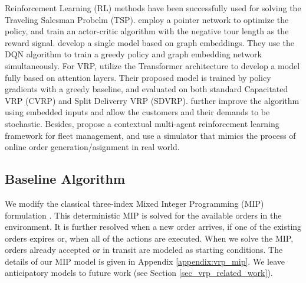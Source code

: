 Reinforcement Learning (RL) methods have been successfully used for solving the Traveling Salesman Probelm (TSP). \citet{bello2016neural} employ a pointer network \cite{vinyals2015pointer} to optimize the policy, and train an actor-critic algorithm with the negative tour length as the reward signal. \citet{khalil2017learning} develop a single model based on graph embeddings. They use the DQN algorithm to train a greedy policy and graph embedding network simultaneously.  For VRP, \citet{kool2018attention} utilize the Transformer architecture \cite{vaswani2017attention} to develop a model fully based on attention layers. Their proposed model is trained by policy gradients with a greedy baseline, and evaluated on both standard Capacitated VRP (CVRP) and Split Deliverry VRP (SDVRP). \citet{nazari2018reinforcement} further improve the algorithm using embedded inputs and allow the customers and their demands to be stochastic. Besides, \citet{lin2018efficient} propose a contextual multi-agent reinforcement learning framework for fleet management, and use a simulator that mimics the process of online order generation/asignment in real world.


\subsection{Baseline Algorithm}
We modify the classical three-index Mixed Integer Programming (MIP) formulation \cite{LuDessouky2004,RopkeCordeau2009, FURTADO2017334}. This deterministic MIP is solved for the available orders in the environment. It is further resolved when a new order arrives, if one of the existing orders expires or, when all of the actions are executed. When we solve the MIP, orders already accepted or in transit are modeled as starting conditions. The details of our MIP model is given in Appendix \ref{appendix:vrp_mip}. We leave anticipatory models to future work (see Section \ref{sec_vrp_related_work}).


